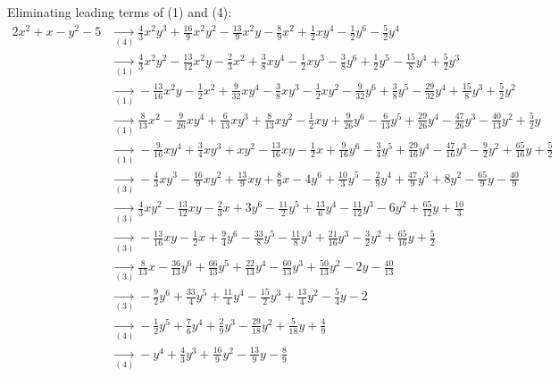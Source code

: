 {Eliminating leading terms of (1) and (4):
\begin{align*}
2x^{2}+x-y^{2}-5&\underset{(4)}{\rightarrow}\frac{4}{3}x^{2}y^{3}+\frac{16}{9}x^{2}y^{2}-\frac{13}{9}x^{2}y-\frac{8}{9}x^{2}+\frac{1}{2}xy^{4}-\frac{1}{2}y^{6}-\frac{5}{2}y^{4}
\\ &\underset{(1)}{\rightarrow}\frac{4}{3}x^{2}y^{2}-\frac{13}{12}x^{2}y-\frac{2}{3}x^{2}+\frac{3}{8}xy^{4}-\frac{1}{2}xy^{3}-\frac{3}{8}y^{6}+\frac{1}{2}y^{5}-\frac{15}{8}y^{4}+\frac{5}{2}y^{3}
\\ &\underset{(1)}{\rightarrow}-\frac{13}{16}x^{2}y-\frac{1}{2}x^{2}+\frac{9}{32}xy^{4}-\frac{3}{8}xy^{3}-\frac{1}{2}xy^{2}-\frac{9}{32}y^{6}+\frac{3}{8}y^{5}-\frac{29}{32}y^{4}+\frac{15}{8}y^{3}+\frac{5}{2}y^{2}
\\ &\underset{(1)}{\rightarrow}\frac{8}{13}x^{2}-\frac{9}{26}xy^{4}+\frac{6}{13}xy^{3}+\frac{8}{13}xy^{2}-\frac{1}{2}xy+\frac{9}{26}y^{6}-\frac{6}{13}y^{5}+\frac{29}{26}y^{4}-\frac{47}{26}y^{3}-\frac{40}{13}y^{2}+\frac{5}{2}y
\\ &\underset{(1)}{\rightarrow}-\frac{9}{16}xy^{4}+\frac{3}{4}xy^{3}+xy^{2}-\frac{13}{16}xy-\frac{1}{2}x+\frac{9}{16}y^{6}-\frac{3}{4}y^{5}+\frac{29}{16}y^{4}-\frac{47}{16}y^{3}-\frac{9}{2}y^{2}+\frac{65}{16}y+\frac{5}{2}
\\ &\underset{(3)}{\rightarrow}-\frac{4}{3}xy^{3}-\frac{16}{9}xy^{2}+\frac{13}{9}xy+\frac{8}{9}x-4y^{6}+\frac{10}{3}y^{5}-\frac{2}{9}y^{4}+\frac{47}{9}y^{3}+8y^{2}-\frac{65}{9}y-\frac{40}{9}
\\ &\underset{(3)}{\rightarrow}\frac{4}{3}xy^{2}-\frac{13}{12}xy-\frac{2}{3}x+3y^{6}-\frac{11}{2}y^{5}+\frac{13}{6}y^{4}-\frac{11}{12}y^{3}-6y^{2}+\frac{65}{12}y+\frac{10}{3}
\\ &\underset{(3)}{\rightarrow}-\frac{13}{16}xy-\frac{1}{2}x+\frac{9}{4}y^{6}-\frac{33}{8}y^{5}-\frac{11}{8}y^{4}+\frac{21}{16}y^{3}-\frac{3}{2}y^{2}+\frac{65}{16}y+\frac{5}{2}
\\ &\underset{(3)}{\rightarrow}\frac{8}{13}x-\frac{36}{13}y^{6}+\frac{66}{13}y^{5}+\frac{22}{13}y^{4}-\frac{60}{13}y^{3}+\frac{50}{13}y^{2}-2y-\frac{40}{13}
\\ &\underset{(3)}{\rightarrow}-\frac{9}{2}y^{6}+\frac{33}{4}y^{5}+\frac{11}{4}y^{4}-\frac{15}{2}y^{3}+\frac{13}{4}y^{2}-\frac{5}{4}y-2
\\ &\underset{(4)}{\rightarrow}-\frac{1}{2}y^{5}+\frac{7}{6}y^{4}+\frac{2}{9}y^{3}-\frac{29}{18}y^{2}+\frac{5}{18}y+\frac{4}{9}
\\ &\underset{(4)}{\rightarrow}-y^{4}+\frac{4}{3}y^{3}+\frac{16}{9}y^{2}-\frac{13}{9}y-\frac{8}{9}

\end{align*}}
